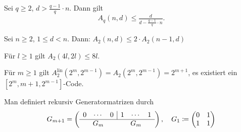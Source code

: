 \documentclass{cheat-sheet}
\newcommand{\F}{\mathbb{F}} %
\newcommand{\lin}{\text{lin}} %
\DeclareMathOperator{\Ham}{Ham} %
\begin{document}
\begin{satz}
  Sei $q \geq 2$, $d > \tfrac{q-1}{q} \cdot n$.
  Dann gilt
  \[ A_q(n, d) \leq \tfrac{d}{d - \tfrac{q-1}{q} \cdot n}. \]
\end{satz}

\begin{lem}
  Sei $n \geq 2$, $1 \leq d < n$.
  Dann: $A_2(n, d) \leq 2 \cdot A_2(n-1, d)$
\end{lem}

\begin{satz}
  Für $l \geq 1$ gilt $A_2(4 l, 2 l) \leq 8 l$.
\end{satz}

\iffalse
\begin{bsp}
  Für $l=8$ gilt $A_2(32, 16) \leq 64$.
\end{bsp}

\begin{bsp}
  $G_2 \coloneqq \begin{psmallmatrix}
    0 & 0 & 1 & 1 \\
    0 & 1 & 0 & 1 \\
    1 & 1 & 1 & 1
  \end{psmallmatrix}$
  erzeugt einen $[4, 3, 2]$-Code $C_2$ über $\F_2$.
\end{bsp}

\begin{bsp}
  Die Parity-Check-Erw. von $\Ham_2(3)$ ist ein $[8, 4, 4]$-Code $C_3$ über $\F_2$.
\end{bsp}

\begin{kor}
  $A_2(4, 2) = A_2^\lin(4, 2) = 8$, \enspace
  $A_2(8, 4) = A_2^\lin(8, 4) = 16$
\end{kor}
\fi

\begin{satz}
  Für $m \geq 1$ gilt $A_2^\lin(2^m, 2^{m-1}) = A_2(2^m, 2^{m-1}) = 2^{m+1}$, \dh{} es existiert ein $[2^m, m+1, 2^{m-1}]$-Code.
\end{satz}

\begin{konstr}
  Man definiert rekursiv Generatormatrizen durch
  \[
    G_{m+1} = \left( \begin{array}{c c c | c c c}
      0 & \cdots & 0 & 1 & \cdots & 1 \\ \hline
      \multicolumn{3}{c}{G_m} & \multicolumn{3}{c}{G_m}
    \end{array} \right), \quad
    G_1 \coloneqq \begin{pmatrix}
      0 & 1 \\
      1 & 1
    \end{pmatrix}
  \]
\end{konstr}
\end{document}

